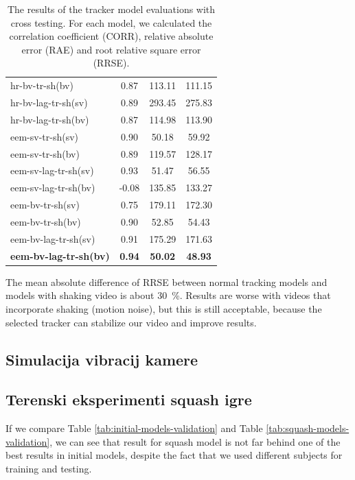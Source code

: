 \begin{table}[!htb]
{\begin{tabular}{l S[table-format=3.2, detect-weight, detect-shape, detect-mode] S[table-format=3.2, detect-weight, detect-shape, detect-mode] S[table-format=3.2, detect-weight, detect-shape, detect-mode]}
        hr-bv-tr-sh(bv)	&	0.87	&	113.11	&	111.15	\\
        hr-bv-lag-tr-sh(sv)	&	0.89	&	293.45	&	275.83	\\
        hr-bv-lag-tr-sh(bv)	&	0.87	&	114.98	&	113.90	\\
        eem-sv-tr-sh(sv)	&	0.90	&	50.18	&	59.92	\\
        eem-sv-tr-sh(bv)	&	0.89	&	119.57	&	128.17	\\
        eem-sv-lag-tr-sh(sv)	&	0.93	&	51.47	&	56.55	\\
        eem-sv-lag-tr-sh(bv)	&	-0.08	&	135.85	&	133.27	\\
        eem-bv-tr-sh(sv)	&	0.75	&	179.11	&	172.30	\\
        eem-bv-tr-sh(bv)	&	0.90	&	52.85	&	54.43	\\
        eem-bv-lag-tr-sh(sv)	&	0.91	&	175.29	&	171.63	\\
        \bfseries eem-bv-lag-tr-sh(bv)	&	\bfseries 0.94	&	\bfseries 50.02	&	\bfseries 48.93	\\
          \bottomrule        
      \end{tabular}
	}
	\caption{The results of the tracker model evaluations with cross testing. For each model, we calculated the correlation coefficient (CORR), relative absolute error (RAE) and root relative square error (RRSE).}
	\label{tab:tracker-models-validation}
\end{table}

The mean absolute difference of RRSE between normal tracking models and models with shaking video is about \SI{30}{\%}. Results are worse with videos that incorporate shaking (motion noise), but this is still acceptable, because the selected tracker can stabilize our video and improve results.















\subsection{Simulacija vibracij kamere}












\subsection{Terenski eksperimenti squash igre}
If we compare Table \ref{tab:initial-models-validation} and Table \ref{tab:squash-models-validation}, we can see that result for squash model is not far behind one of the best results in initial models, despite the fact that we used different subjects for training and testing. 


